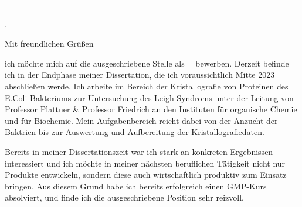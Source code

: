 
\makeletterclosing



=======




\recipient{\firma{}}{\adresse{}}
\opening{\anrede{},}
\date{\today}
\closing{Mit freundlichen Grüßen}
{}
\makelettertitle
\justifying



ich möchte mich auf die ausgeschriebene Stelle als \stelleText~\firmaText~bewerben. Derzeit befinde ich in der Endphase meiner Dissertation, die ich voraussichtlich Mitte 2023 abschließen werde. Ich arbeite im Bereich der Kristallografie von Proteinen des E.Coli Bakteriums zur Untersuchung des Leigh-Syndroms unter der Leitung von Professor Plattner \& Professor Friedrich an den Instituten für organische Chemie und für Biochemie. Mein Aufgabenbereich reicht dabei von der Anzucht der Baktrien bis zur Auswertung und Aufbereitung der Kristallografiedaten.\par
Bereits in meiner Dissertationszeit war ich stark an konkreten Ergebnissen interessiert und ich möchte in meiner nächsten beruflichen Tätigkeit nicht nur Produkte entwickeln, sondern diese auch wirtschaftlich produktiv zum Einsatz bringen. Aus diesem Grund habe ich bereits erfolgreich einen GMP-Kurs absolviert, und finde ich die ausgeschriebene Position sehr reizvoll.\par 


